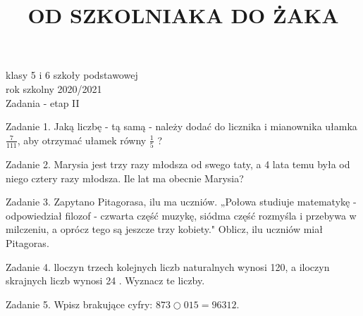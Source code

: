 \documentclass[10pt]{article}
\title{OD SZKOLNIAKA DO ŻAKA }
\author{}
\date{}
\begin{document}
\maketitle
klasy 5 i 6 szkoły podstawowej\\
rok szkolny 2020/2021\\
Zadania - etap II

Zadanie 1. Jaką liczbę - tą samą - należy dodać do licznika i mianownika ułamka \(\frac{7}{111}\), aby otrzymać ułamek równy \(\frac{1}{5}\) ?

Zadanie 2. Marysia jest trzy razy młodsza od swego taty, a 4 lata temu była od niego cztery razy młodsza. Ile lat ma obecnie Marysia?

Zadanie 3. Zapytano Pitagorasa, ilu ma uczniów. „Połowa studiuje matematykę - odpowiedział filozof - czwarta część muzykę, siódma część rozmyśla i przebywa w milczeniu, a oprócz tego są jeszcze trzy kobiety." Oblicz, ilu uczniów miał Pitagoras.

Zadanie 4. lloczyn trzech kolejnych liczb naturalnych wynosi 120, a iloczyn skrajnych liczb wynosi 24 . Wyznacz te liczby.

Zadanie 5. Wpisz brakujące cyfry: \(873 \bigcirc 015=96312\).
\end{document}
